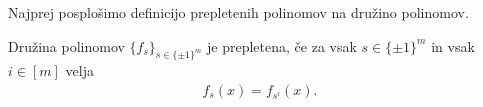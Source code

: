 Najprej posplošimo definicijo prepletenih polinomov na družino polinomov.

\begin{definicija}

    Družina polinomov \(\{f_s\}_{s\in \{\pm 1\}^m}\) je prepletena, če za vsak \(s\in \{\pm 1\}^m\) in vsak \(i\in [m]\) velja
    \begin{align*}
        f_s(x) = f_{s^i}(x).
    \end{align*}
\end{definicija}